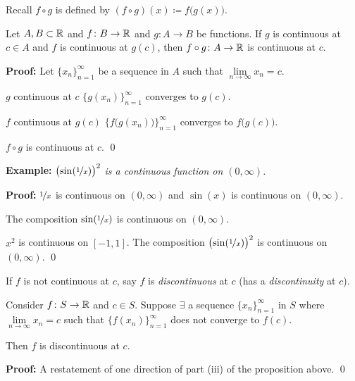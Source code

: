 \documentclass[10pt,aspectratio=169]{beamer}
\begin{document}
\begin{frame}

Recall $f \circ g$ is defined by
$(f \circ g)(x) \coloneqq f\bigl(g(x)\bigr)$.
\pause

\begin{proposition}
Let $A, B \subset {\mathbb{R}}$ and $f \colon B \to {\mathbb{R}}$ and $g \colon A \to B$ be
functions.  If $g$ is continuous at $c \in A$ and
$f$ is continuous at $g(c)$, then $f \circ g \colon A \to {\mathbb{R}}$ is continuous
at $c$.
\end{proposition}

\pause
\textbf{Proof:}
Let $\{ x_n \}_{n=1}^\infty$ be a sequence in $A$ such that
$\lim\limits_{n\to\infty} x_n = c$.

\pause
$g$ continuous at $c$ \wthus $\bigl\{ g(x_n) \bigr\}_{n=1}^\infty$ converges to $g(c)$.

\pause
$f$ continuous at $g(c)$ \wthus $\bigl\{ f\bigl(g(x_n)\bigr) \bigr\}_{n=1}^\infty$ converges to $f\bigl(g(c)\bigr)$.

\pause
\thus \quad $f \circ g$ is continuous at $c$.
\qed

\pause
\medskip

\textbf{Example:}
\emph{${\bigl(\sin(\nicefrac{1}{x})\bigr)}^2$ is a continuous
function on $(0,\infty)$.}

\pause
\medskip

\textbf{Proof:} $\nicefrac{1}{x}$ is continuous on $(0,\infty)$
and $\sin(x)$ is continuous on $(0,\infty)$.

\pause
\thus \quad The composition $\sin(\nicefrac{1}{x})$ is continuous on
$(0,\infty)$.

\pause
$x^2$ is continuous on $[-1,1]$.
\pause
\wthus
The composition ${\bigl(\sin(\nicefrac{1}{x})\bigr)}^2$ is continuous on $(0,\infty)$.
\qed

\end{frame}

\begin{frame}
If $f$ is not continuous at $c$,
say $f$ is \emph{discontinuous} at $c$ (has a \emph{discontinuity} at $c$).

\pause
\begin{proposition}
Consider $f \colon S \to {\mathbb{R}}$ and $c \in S$.  Suppose 
$\exists$ a sequence $\{ x_n \}_{n=1}^\infty$ in $S$ where
$\lim\limits_{n\to\infty} x_n = c$
such that $\bigl\{ f(x_n) \bigr\}_{n=1}^\infty$ does not converge to $f(c)$.

\medskip
\pause

Then $f$ is 
discontinuous at $c$.
\end{proposition}

\pause
\textbf{Proof:} A restatement of one direction of part (iii) of the
proposition above.
\qed

\end{frame}
\end{document}
